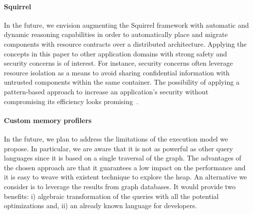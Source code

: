 \paragraph{Squirrel}

In the future, we envision augmenting the Squirrel framework with automatic and dynamic reasoning capabilities in order to automatically place and migrate components with resource contracts over a distributed architecture.
Applying the concepts in this paper to other application domains with strong safety and security concerns is of interest.
For instance, security concerns often leverage resource isolation as a means to avoid sharing confidential information with untrusted components within the same container.
The possibility of applying a pattern-based approach to increase an application's security without compromising its efficiency looks promising~\cite{DBLP:conf/kbse/MorinMFTBJ10}.




\paragraph{Custom memory profilers}
In the future, we plan to address the limitations of the execution model we propose.
In particular, we are aware that it is not as powerful as other query languages since it is based on a single traversal of the graph.
The advantages of the chosen approach are that it guarantees a low impact on the performance and it is easy to weave with existent technique to explore the heap.
An alternative we consider is to leverage the results from graph databases.
It would provide two benefits: i) algebraic transformation of the queries with all the potential optimizations and, ii) an already known language for developers.

